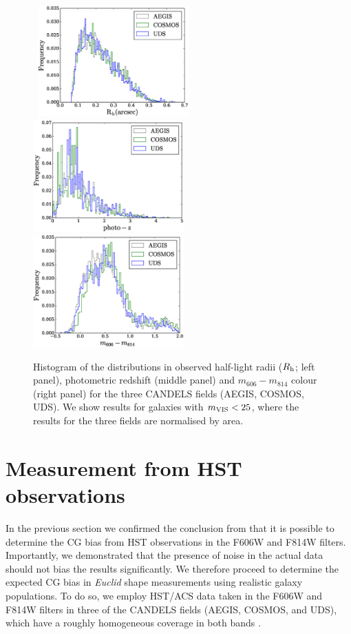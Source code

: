 \documentclass[useAMS,usenatbib]{mnras}
\begin{document}
\begin{figure}
  \hbox{
    \includegraphics[width=5.8cm]{zhisrh.eps}
    \includegraphics[width=5.8cm]{zhisphotoz.eps}
    \includegraphics[width=5.8cm]{zhiscolor.eps}}
  \caption{Histogram of the distributions in observed half-light radii ($R_{\rm h}$; left panel),
  photometric redshift (middle panel) and $m_{606}-m_{814}$ colour (right panel) for the three
  CANDELS fields (AEGIS, COSMOS, UDS). We show results for galaxies with $m_{\rm VIS}<25$,
  where the results for the three fields are normalised by area.}
  \label{fig:datapro1}
\end{figure}
%
\section{Measurement from HST observations}
\label{sec:candels}

In the previous section we confirmed the conclusion from
 that it is possible to determine the CG bias
from HST observations in the F606W and F814W filters. Importantly, we
demonstrated that the presence of noise in the actual data should not
bias the results significantly. We therefore proceed to determine the
expected CG bias in {\it Euclid} shape measurements using realistic
galaxy populations. To do so, we employ HST/ACS data taken in the
F606W and F814W filters in three of the CANDELS fields (AEGIS, COSMOS,
and UDS), which have a roughly homogeneous coverage in both bands
\citep[see][]{davis2007,grogin2011,Koekemoer11}.
\end{document}
